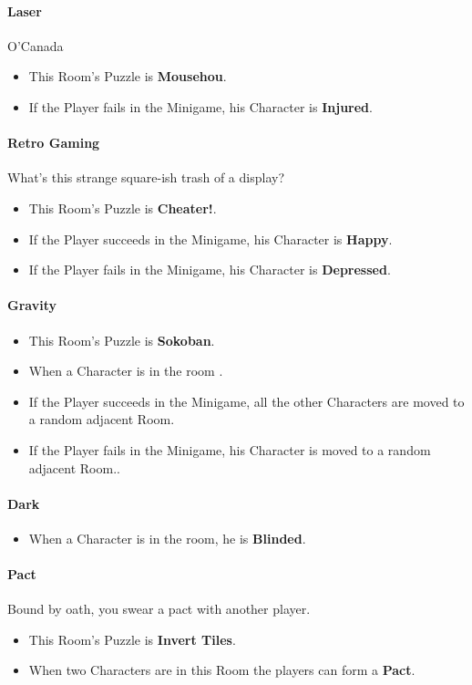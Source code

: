 \paragraph{Laser} O'Canada
\begin{itemize}
	\item This Room's Puzzle is \textbf{Mousehou}.
	\item If the Player fails    in the Minigame, his Character is \textbf{Injured}.
\end{itemize}

\paragraph{Retro Gaming} What's this strange square-ish trash of a display?
\begin{itemize}
	\item This Room's Puzzle is \textbf{Cheater!}.
	\item If the Player succeeds in the Minigame, his Character is \textbf{Happy}.
	\item If the Player fails    in the Minigame, his Character is \textbf{Depressed}.
\end{itemize}

\paragraph{Gravity} 
\begin{itemize}
	\item This Room's Puzzle is \textbf{Sokoban}.
	\item When a Character is in the room .
	\item If the Player succeeds in the Minigame, all the other Characters are moved to a random adjacent Room.
	\item If the Player fails    in the Minigame, his Character is moved to a random adjacent Room..
\end{itemize}

\paragraph{Dark} 
\begin{itemize}
	\item When a Character is in the room, he is \textbf{Blinded}.
\end{itemize}

\paragraph{Pact} Bound by oath, you swear a pact with another player. 
\begin{itemize}
	\item This Room's Puzzle is \textbf{Invert Tiles}.
	\item When two Characters are in this Room the players can form a \textbf{Pact}.
\end{itemize}

